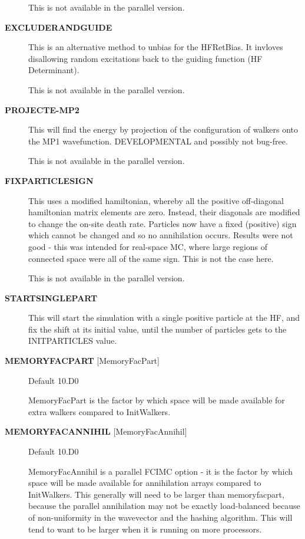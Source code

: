 \documentclass[openany,a4paper,10pt]{manual}
\begin{document}
\begin{description}
This is not available in the parallel version.

\item[\textbf{EXCLUDERANDGUIDE}]
This is an alternative method to unbias for the HFRetBias. It invloves
disallowing random excitations back to the guiding function (HF
Determinant).

This is not available in the parallel version.

\item[\textbf{PROJECTE-MP2}]
This will find the energy by projection of the configuration of walkers
onto the MP1 wavefunction.  DEVELOPMENTAL and possibly not bug-free.

This is not available in the parallel version.

\item[\textbf{FIXPARTICLESIGN}]
This uses a modified hamiltonian, whereby all the positive off-diagonal
hamiltonian matrix elements are zero. Instead, their diagonals are modified
to change the on-site death rate. Particles now have a fixed (positive)
sign which cannot be changed and so no annihilation occurs.  Results were
not good - this was intended for real-space MC, where large regions of connected
space were all of the same sign. This is not the case here.

This is not available in the parallel version.

\item[\textbf{STARTSINGLEPART}]
This will start the simulation with a single positive particle at the HF,
and fix the shift at its initial value, until the number of particles gets
to the INITPARTICLES value.

\item[\textbf{MEMORYFACPART} {[}MemoryFacPart{]}]
Default 10.D0

MemoryFacPart is the factor by which space will be made available for extra
walkers compared to InitWalkers.

\item[\textbf{MEMORYFACANNIHIL} {[}MemoryFacAnnihil{]}]
Default 10.D0

MemoryFacAnnihil is a parallel FCIMC option - it is the factor by which space will be
made available for annihilation arrays compared to InitWalkers. This generally will need to be
larger than memoryfacpart, because the parallel annihilation may not be exactly load-balanced because of
non-uniformity in the wavevector and the hashing algorithm. This will tend to want to be larger
when it is running on more processors.


\end{description}
\end{document}
